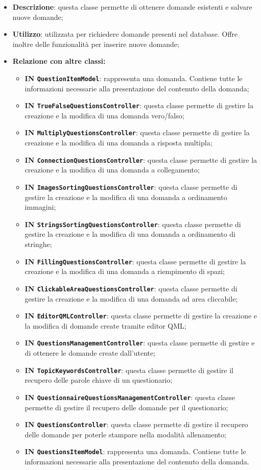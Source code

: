 \begin{itemize}
	\item \textbf{Descrizione}: questa classe permette di ottenere domande esistenti e salvare nuove domande;
	\item \textbf{Utilizzo}: utilizzata per richiedere domande presenti nel database. Offre inoltre delle funzionalità per inserire nuove domande;
	\item \textbf{Relazione con altre classi:}
	\begin{itemize}
		\item \textbf{IN \texttt{QuestionItemModel}}: rappresenta una domanda. Contiene tutte le informazioni necessarie alla
		presentazione del contenuto della domanda; 
		\item \textbf{IN \texttt{TrueFalseQuestionsController}}: questa classe permette di gestire la creazione e la modifica di una domanda vero/falso;
		\item \textbf{IN \texttt{MultiplyQuestionsController}}: questa classe permette di gestire la creazione e la modifica di una domanda a risposta multipla; 
		\item \textbf{IN \texttt{ConnectionQuestionsController}}: questa classe permette di gestire la creazione e la modifica di una domanda a collegamento;
		\item \textbf{IN \texttt{ImagesSortingQuestionsController}}: questa classe permette di gestire la creazione e la modifica di una domanda a ordinamento immagini;
		\item \textbf{IN \texttt{StringsSortingQuestionsController}}: questa classe permette di gestire la creazione e la modifica di una domanda a ordinamento di stringhe;
		\item \textbf{IN \texttt{FillingQuestionsController}}: questa classe permette di gestire la creazione e la modifica di una domanda a riempimento di spazi; 
		\item \textbf{IN \texttt{ClickableAreaQuestionsController}}: questa classe permette di gestire la creazione e la modifica di una domanda ad area cliccabile;
		\item \textbf{IN \texttt{EditorQMLController}}: questa classe permette di gestire la creazione e la modifica di domande create tramite editor QML;
		\item \textbf{IN \texttt{QuestionsManagementController}}: questa classe permette di gestire e di ottenere le domande create dall'utente;
		\item \textbf{IN \texttt{TopicKeywordsController}}: questa classe permette di gestire il recupero delle parole chiave di un questionario;
		\item \textbf{IN \texttt{QuestionnaireQuestionsManagementController}}: questa classe permette di gestire il recupero delle domande per il questionario;
		\item \textbf{IN \texttt{QuestionsController}}: questa classe permette di gestire il recupero delle domande per poterle stampare nella modalità allenamento;
		\item \textbf{IN \texttt{QuestionsItemModel}}: rappresenta una domanda. Contiene tutte le informazioni necessarie alla presentazione del contenuto della domanda.
		

\end{itemize}
\end{itemize}
